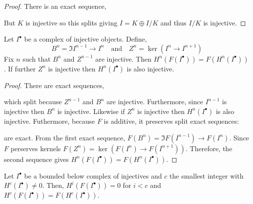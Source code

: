 \documentclass[12pt]{article}
\begin{document}
\begin{proof}
There is an exact sequence,
\begin{center}
\end{center}
But $K$ is injective so this splits giving $I = K \oplus I/K$ and thus $I/K$ is injective.
\end{proof}

\begin{lemma}
Let $I^\bullet$ be a complex of injective objects. Define, 
\[ B^n = \Im{I^{n-1} \to I^n} \quad \text{and} \quad Z^n = \ker{(I^n \to I^{n+1})} \]
Fix $n$ such that $B^n$ and $Z^{n-1}$ are injective. Then $H^n(F(I^\bullet)) = F(H^n(I^\bullet))$. If further $Z^n$ is injective then $H^n(I^\bullet)$ is also injective.
\end{lemma}

\begin{proof}
There are exact sequences,
\begin{center}
\end{center}
which split because $Z^{n-1}$ and $B^n$ are injective. Furthermore, since $I^{n-1}$ is injective then $B^n$ is injective. Likewise if $Z^n$ is injective then $H^n(I^\bullet)$ is also injective. Futhermore, because $F$ is additive, it preserves split exact sequences:
\begin{center}
\end{center}
are exact. From the first exact sequence, $F(B^n) = \Im{F(I^{n-1}) \to F(I^n)}$. Since $F$ perserves kernels $F(Z^n) = \ker{(F(I^n) \to F(I^{n+1}))}$. Therefore, the second sequence gives $H^n(F(I^\bullet)) = F(H^n(I^\bullet))$.
\end{proof}

\begin{lemma} \label{compute_first_nonzero_cohomology}
Let $I^\bullet$ be a bounded below complex of injectives and $c$ the smallest integer with $H^c(I^\bullet) \neq 0$. Then, $H^i(F(I^\bullet)) = 0$ for $i < c$ and $H^c(F(I^\bullet)) = F(H^c(I^\bullet))$.
\end{lemma}
\end{document}

